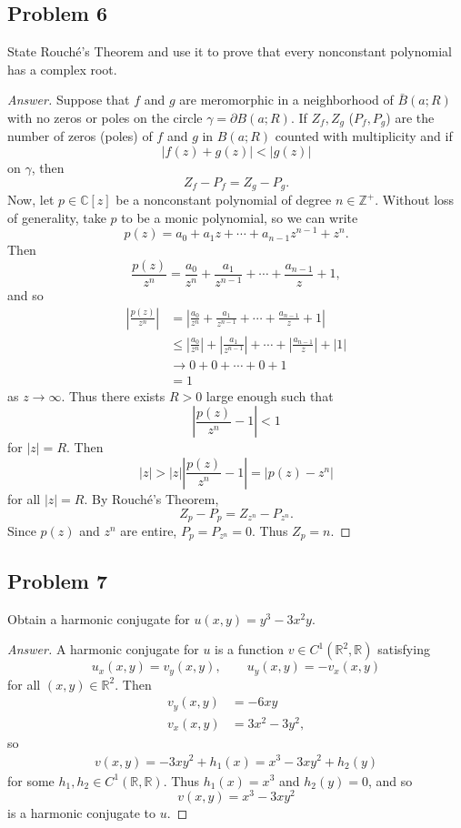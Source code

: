 \documentclass[12pt]{article}
\newcommand{\z}{\mathbb{Z}}
\newcommand{\cx}{\mathbb{C}}
\newcommand{\real}{\mathbb{R}}
\newcommand{\abs}[1]{\left| #1 \right|}
\theoremstyle{definition}
\begin{document}
\subsection{Problem 6 \texorpdfstring{\cite{Conway}}{}}
State Rouch\'e's Theorem and use it to prove that every nonconstant polynomial has a complex root.
\begin{proof}[Answer]
    Suppose that $f$ and $g$ are meromorphic in a neighborhood of $\bar{B}(a;R)$ with no zeros or poles on the circle $\gamma = \partial B(a;R)$. If $Z_f,Z_g$ ($P_f,P_g$) are the number of zeros (poles) of $f$ and $g$ in $B(a;R)$ counted with multiplicity and if 
    \[
        |f(z) + g(z)| < |g(z)|
    \]
    on $\gamma$, then 
    \[
        Z_f - P_f = Z_g - P_g.
    \]
    Now, let $p \in \cx[z]$ be a nonconstant polynomial of degree $n \in \z^+$. Without loss of generality, take $p$ to be a monic polynomial, so we can write 
    \[
        p(z) = a_0 + a_1 z + \dotsb + a_{n-1} z^{n-1} + z^n.
    \]
    Then 
    \[
        \frac{p(z)}{z^n} = \frac{a_0}{z^n} + \frac{a_1}{z^{n-1}} + \dotsb + \frac{a_{n-1}}{z} + 1,
    \]
    and so 
    \begin{align*}
        \abs{ \frac{p(z)}{z^n} } & = \abs{ \frac{a_0}{z^n} + \frac{a_1}{z^{n-1}} + \dotsb + \frac{a_{n-1}}{z} + 1 } \\
        & \leq \abs{ \frac{a_0}{z^n} } + \abs{ \frac{a_1}{z^{n-1}} } + \dotsb + \abs{ \frac{a_{n-1}}{z} } + \abs{ 1 } \\
        & \to 0 + 0 + \dotsb + 0 + 1 \\
        & = 1
    \end{align*}
    as $z \to \infty$. Thus there exists $R > 0$ large enough such that 
    \[
        \abs{ \frac{p(z)}{z^n} - 1 } < 1
    \]
    for $|z| = R$. Then 
    \[
        \abs{z} > \abs{z}\abs{ \frac{p(z)}{z^n} - 1 } = \abs{ p(z) - z^n }
    \]
    for all $|z| = R$. By Rouch\'e's Theorem, 
    \[
        Z_p - P_p = Z_{z^n} - P_{z^n}.
    \]
    Since $p(z)$ and $z^n$ are entire, $P_p = P_{z^n} = 0$. Thus $Z_p = n$.
\end{proof}

\subsection{Problem 7}
Obtain a harmonic conjugate for $u(x,y) = y^3 - 3x^2 y$.
\begin{proof}[Answer]
    A harmonic conjugate for $u$ is a function $v \in C^1(\real^2,\real)$ satisfying
    \[
        u_x(x,y) = v_y(x,y) , \qquad u_y(x,y) = -v_x(x,y)
    \]
    for all $(x,y) \in \real^2$. Then 
    \begin{align*}
        v_y(x,y) & = -6xy \\
        v_x(x,y) & = 3x^2 - 3y^2,
    \end{align*}
    so 
    \begin{align*}
        v(x,y) = -3xy^2 + h_1(x) = x^3 - 3xy^2 + h_2(y)
    \end{align*}
    for some $h_1 , h_2 \in C^1(\real,\real)$. Thus $h_1(x) = x^3$ and $h_2(y) = 0$, and so 
    \[
        v(x,y) = x^3 - 3xy^2
    \]
    is a harmonic conjugate to $u$.
\end{proof}
\end{document}

